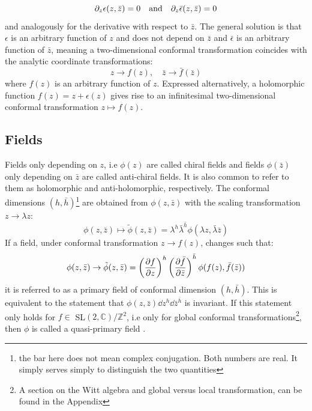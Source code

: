 \documentclass[11pt, a4paper, oneside]{book}
\theoremstyle{definition} %
\begin{document}
\begin{equation}
	\partial_z \epsilon(z, \bar{z}) = 0 \qq{and} \partial_z \bar{\epsilon}(z, \bar{z}) =0
\end{equation}
and analogously for the derivative with respect to $\bar{z}$. The general solution is that $\epsilon$ is an arbitrary function of $z$ and does not depend on $\bar{z}$ and $\bar{\epsilon}$ is an arbitrary function of $\bar{z}$, meaning a two-dimensional conformal transformation coincides with the analytic coordinate transformations:
\begin{equation}
	z \rightarrow f(z), \quad \bar{z} \rightarrow \bar{f}(\bar{z})
\end{equation}
where $f(z)$ is an arbitrary function of $z$. Expressed alternatively, a holomorphic function $f(z) = z + \epsilon(z)$ gives rise to an infinitesimal two-dimensional conformal transformation $z \mapsto f(z)$. \cite{Francesco}\cite{Schellekens}


\subsection{Fields}
Fields only depending on $z$, i.e $\phi(z)$ are called chiral fields and fields $\phi(\bar{z})$ only depending on $\bar{z}$ are called anti-chiral fields. It is also common to refer to them as holomorphic and anti-holomorphic, respectively. The conformal dimensions $(h, \bar{h})$\footnote{the bar here does not mean complex conjugation. Both numbers are real. It simply serves simply to distinguish the two quantities} are obtained from $\phi(z,\bar{z})$ with the scaling transformation $z \rightarrow \lambda z$:
\begin{equation}
	\phi(z, \bar{z}) \mapsto \tilde{\phi}(z,\bar{z}) = \lambda^h \bar{\lambda}^{\bar{h}} \phi(\lambda z, \bar{\lambda}\bar{z})
\end{equation}
If a field, under conformal transformation $z \rightarrow f(z)$, changes such that:
\begin{equation}
	\phi(z,\bar{z}) \rightarrow \tilde{\phi}(z, \bar{z}) =\left(\pdv{f}{z}\right)^h \left(\pdv{\bar{f}}{\bar{z}}\right)^{\bar{h}}\phi(f(z), \bar{f}(\bar{z}))
	\label{eq:conformal_transformation2d}
\end{equation}
it is referred to as a primary field of conformal dimension $(h, \bar{h})$. This is equivalent to the statement that $\phi(z, \bar{z}) \dd z^h \dd \bar{z}^{\bar{h}}$ is invariant. If this statement only holds for $f \in$ SL$(2,\mathbb{C})/\mathbb{Z}^2$, i.e only for global conformal transformations\footnote{A section on the Witt algebra and global versus local transformation, can be found in the Appendix}, then $\phi$ is called a quasi-primary field \cite{Blumenhagen}.
\end{document}
